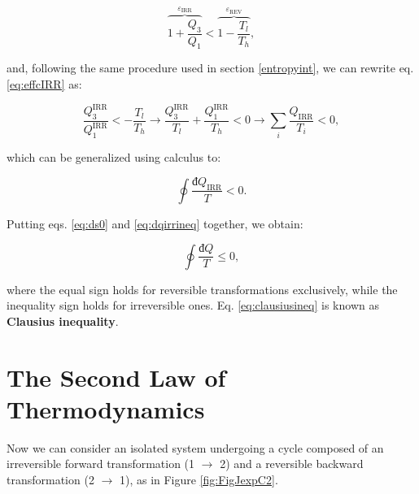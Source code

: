 \documentclass[
  9pt,
]{extbook}
\theoremstyle{definition}
\theoremstyle{definition}
\theoremstyle{definition}
\theoremstyle{remark}
\begin{document}
\begin{equation}
\overbrace{1+\frac{Q_3}{Q_1}}^{\varepsilon_{\mathrm{IRR}}} < \overbrace{1-\frac{T_l}{T_h}}^{\varepsilon_{\mathrm{REV}}},
\label{eq:effcIRR}
\end{equation}

and, following the same procedure used in section \ref{entropyint}, we can rewrite eq. \eqref{eq:effcIRR} as:

\begin{equation}
\frac{Q^{\text{IRR}}_3}{Q^{\text{IRR}}_1} < - \frac{T_l}{T_h} \longrightarrow \frac{Q^{\text{IRR}}_3}{T_l} + \frac{Q^{\text{IRR}}_1}{T_h} < 0 \longrightarrow \sum_i \frac{Q_{\text{IRR}}}{T_i} < 0,
\label{eq:effcIRR2}
\end{equation}

which can be generalized using calculus to:

\begin{equation}
\oint \frac{đQ_{\mathrm{IRR}}}{T} < 0.
\label{eq:dqirrineq}
\end{equation}

Putting eqs. \eqref{eq:ds0} and \eqref{eq:dqirrineq} together, we obtain:

\begin{equation}
\oint \frac{đQ}{T} \leq 0,
\label{eq:clausiusineq}
\end{equation}

where the equal sign holds for reversible transformations exclusively, while the inequality sign holds for irreversible ones. Eq. \eqref{eq:clausiusineq} is known as \textbf{Clausius inequality}.

\hypertarget{secondlaw}{%
\section{The Second Law of Thermodynamics}\label{secondlaw}}

Now we can consider an isolated system undergoing a cycle composed of an irreversible forward transformation (1 \(\rightarrow\) 2) and a reversible backward transformation (2 \(\rightarrow\) 1), as in Figure \ref{fig:FigJexpC2}.
\end{document}
